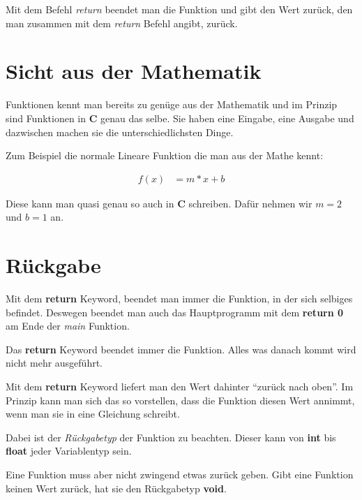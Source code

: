 \documentclass[c_worksheet.tex]{subfiles}
\begin{document}
Mit dem Befehl \emph{return} beendet man die Funktion und gibt den Wert zurück, den man zusammen mit dem \emph{return} Befehl angibt, zurück.

\section{Sicht aus der Mathematik}

Funktionen kennt man bereits zu genüge aus der Mathematik und im Prinzip sind Funktionen in \textbf{C} genau das selbe. Sie haben eine Eingabe, eine Ausgabe und dazwischen machen sie die unterschiedlichsten Dinge.

Zum Beispiel die normale Lineare Funktion die man aus der Mathe kennt:

\begin{align*}
 f(x) &= m*x + b
 \end{align*} 

 Diese kann man quasi genau so auch in \textbf{C} schreiben. Dafür nehmen wir \(m=2\) und \(b=1\) an.

 


\section{Rückgabe} 

Mit dem \textbf{return} Keyword, beendet man immer die Funktion, in der sich selbiges befindet. Deswegen beendet man auch das Hauptprogramm mit dem \textbf{return 0} am Ende der \emph{main} Funktion.

Das \textbf{return} Keyword beendet immer die Funktion. Alles was danach kommt wird nicht mehr ausgeführt.



Mit dem \textbf{return}	Keyword liefert man den Wert dahinter ``zurück nach oben''. Im Prinzip kann man sich das so vorstellen, dass die Funktion diesen Wert annimmt, wenn man sie in eine Gleichung schreibt.

Dabei ist der \emph{Rückgabetyp} der Funktion zu beachten. Dieser kann von \textbf{int} bis \textbf{float} jeder Variablentyp sein.

  

Eine Funktion muss aber nicht zwingend etwas zurück geben. Gibt eine Funktion keinen Wert zurück, hat sie den Rückgabetyp \textbf{void}.

 
\end{document}
